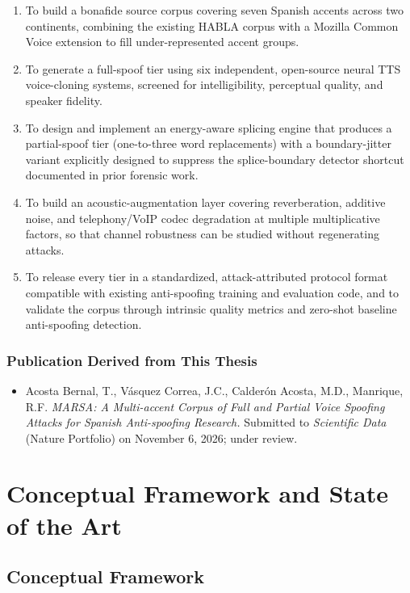 \documentclass[11pt]{report}
\begin{document}
\begin{enumerate}
  \item To build a bonafide source corpus covering seven Spanish accents
  across two continents, combining the existing HABLA corpus with a
  Mozilla Common Voice extension to fill under-represented accent groups.
  \item To generate a full-spoof tier using six independent, open-source
  neural TTS voice-cloning systems, screened for intelligibility,
  perceptual quality, and speaker fidelity.
  \item To design and implement an energy-aware splicing engine that
  produces a partial-spoof tier (one-to-three word replacements) with a
  boundary-jitter variant explicitly designed to suppress the
  splice-boundary detector shortcut documented in prior forensic work.
  \item To build an acoustic-augmentation layer covering reverberation,
  additive noise, and telephony/VoIP codec degradation at multiple
  multiplicative factors, so that channel robustness can be studied
  without regenerating attacks.
  \item To release every tier in a standardized, attack-attributed
  protocol format compatible with existing anti-spoofing training and
  evaluation code, and to validate the corpus through intrinsic quality
  metrics and zero-shot baseline anti-spoofing detection.
\end{enumerate}

\subsection*{Publication Derived from This Thesis}
\begin{itemize}
  \item Acosta Bernal, T., V\'asquez Correa, J.C., Calder\'on Acosta,
  M.D., Manrique, R.F. \emph{MARSA: A Multi-accent Corpus of Full and
  Partial Voice Spoofing Attacks for Spanish Anti-spoofing Research.}
  Submitted to \emph{Scientific Data} (Nature Portfolio) on November 6,
  2026; under review.
\end{itemize}

\chapter{Conceptual Framework and State of the Art}
\label{ch:background}

\section{Conceptual Framework}
\end{document}

